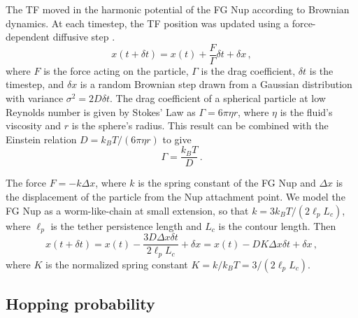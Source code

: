 The TF moved in the harmonic potential of the FG Nup according to Brownian dynamics. At each timestep, the TF position was updated using a force-dependent diffusive step \cite{blackwell17}.
\begin{equation}
  x(t+\delta t) = x(t) + \frac{F}{\Gamma} \delta t + \delta x\,,
\end{equation} 
where $F$ is the force acting on the particle, $\Gamma$ is the drag coefficient, $\delta t$ is the timestep, and $\delta x$ is a random Brownian step drawn from a Gaussian distribution with variance $\sigma^2 = 2 D \delta t$. The drag coefficient of a spherical particle at low Reynolds number is given by Stokes' Law as $\Gamma = 6 \pi \eta r$, where $\eta$ is the fluid's viscosity and $r$ is the sphere's radius.  This result can be combined with the Einstein relation $D = k_B T / (6\pi \eta r)$ to give
\begin{equation}
\Gamma= \frac{k_B T}{D}\,.
\end{equation}
 
The force $F = -k\Delta x$, where $k$ is the spring constant of the FG Nup and $\Delta x$ is the displacement of the particle from the Nup attachment point.  We model the FG Nup as a worm-like-chain at small extension, so that $k = 3 k_B T/(2\ell_pL_c)$, where $\ell_p$ is the tether persistence length and $L_c$ is the contour length.  Then 
\begin{equation}
  x(t+\delta t) = x(t) - \frac{3 D \Delta x \delta t}{2\ell_p L_c }+
  \delta x = x(t) - D K \Delta x \delta t+ \delta x\,,
\end{equation}
where $K$ is the normalized spring constant $K = k/k_B T = 3/(2 \ell_p L_c)$.

\subsection{Hopping probability}


